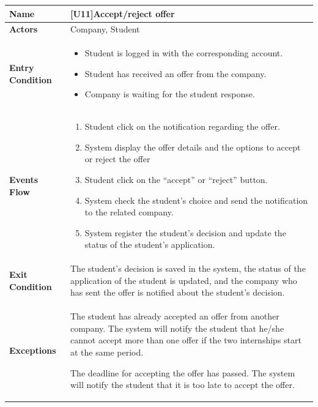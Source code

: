 \begin{center}
    \begin{tabular}{|p{9em}|p{27em}|}
        \hline
        \rowcolor{bluepoli!40} %
        \textbf{Name} & \textbf{[U11]Accept/reject offer} \\
        \hline
        \textbf{Actors} & Company, Student\\
        \hline
        \textbf{Entry Condition} & 
        \begin{itemize}
            \item Student is logged in with the corresponding account.
            \item Student has received an offer from the company.
            \item Company is waiting for the student response.
        \end{itemize} \\
        \hline
        \textbf{Events Flow} & 
        \begin{enumerate}
            \item Student click on the notification regarding the offer.
            \item System display the offer details and the options to accept or reject the offer
            \item Student click on the ``accept'' or ``reject'' button.
            \item System check the student's choice and send the notification to the related company.
            \item System register the student's decision and update the status of the student's application.
        \end{enumerate} \\
        \hline
        \textbf{Exit Condition} & 
         The student's decision is saved in the system, the status of the application of the student is updated, and the company
         who has sent the offer is notified about the student's decision.\\
        \hline
        \textbf{Exceptions} &
        The student has already accepted an offer from another company. The system will notify the student that he/she cannot accept
        more than one offer if the two internships start at the same period.

        The deadline for accepting the offer has passed. The system will notify the student that it is too late to accept the offer.\\
        \hline
    \end{tabular}
\end{center}

